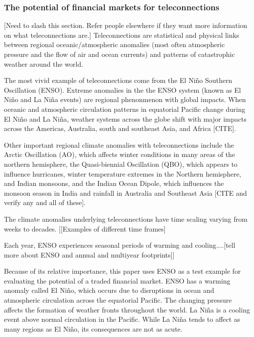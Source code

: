 \documentclass[authoryear]{article}
\begin{document}
\begin{comment}
Note: as I understand it, and tried to use it in my dissertation, teleconnection refers not to the index but to its links to far flung weather systems i.e. ENSO is not a teleconnection, it HAS teleconnections. Thats why I talk about markets on teleconnection risk rather than markets on teleconnections.
\end{comment}
\subsubsection{The potential of financial markets for teleconnections}
[Need to slash this section. Refer people elsewhere if they want more information on what teleconnections are.]
Teleconnections are statistical and physical links between regional oceanic/atmospheric anomalies (most often atmospheric pressure and the flow of air and ocean currents) and patterns of catastrophic weather around the world.

The most vivid example of teleconnections come from the El Ni\~no Southern Oscillation (ENSO). Extreme anomalies in the the ENSO system (known as El Ni\~no and La Ni\~na events) are regional phenonmenon with global impacts. When oceanic and atmospheric circulation patterns in equatorial Pacific change during El Ni\~no and La Ni\~na, weather systems across the globe shift with major impacts across the Americas, Australia, south and southeast Asia, and Africa [CITE].

Other important regional climate anomalies with teleconnections include the Arctic Oscillation (AO), which affects winter conditions in many areas of the northern hemisphere, the Quasi-biennial Oscillation (QBO), which appears to influence hurricanes, winter temperature extremes in the Northern hemisphere, and Indian monsoons, and the Indian Ocean Dipole, which influences the monsoon season in India and rainfall in Australia and Southeast Asia [CITE and verify any and all of these].

The climate anomalies underlying teleconnections have time scaling varying from weeks to decades. [[Examples of different time frames]

Each year, ENSO experiences seasonal periods of warming and cooling....[tell more about ENSO and annual and multiyear footprints]]

Because of its relative importance, this paper uses ENSO as a test example for evaluating the potential of a traded financial market. ENSO has a warming anomaly called El Ni\~no, which occurs due to disruptions in ocean and atmospheric circulation across the equatorial Pacific. The changing pressure affects the formation of weather fronts throughout the world. La Ni\~na is a cooling event above normal circulation in the Pacific. While La Ni\~na tends to affect as many regions as El Ni\~no, its consequences are not as acute.
\end{document}
